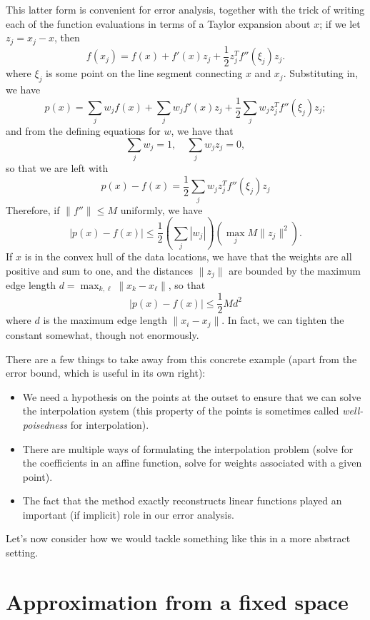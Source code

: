 \documentclass[12pt, leqno]{article} %
\begin{document}
This latter form is convenient for error analysis, together with the
trick of writing each of the function evaluations in terms of a Taylor
expansion about $x$; if we let $z_j = x_j-x$, then
\[
  f(x_j) = f(x) + f'(x) z_j + \frac{1}{2} z_j^T f''(\xi_j) z_j.
\]
where $\xi_j$ is some point on the line segment connecting $x$ and
$x_j$.  Substituting in, we have
\[
  p(x) =
  \sum_{j} w_j f(x) + \sum_j w_j f'(x) z_j +
  \frac{1}{2} \sum_j w_j z_j^T f''(\xi_j) z_j;
\]
and from the defining equations for $w$, we have that 
\[
  \sum_j w_j = 1, \quad \sum_j w_j z_j = 0,
\]
so that we are left with
\[
  p(x) - f(x) = \frac{1}{2} \sum_j w_j z_j^T f''(\xi_j) z_j
\]
Therefore, if $\|f''\| \leq M$ uniformly, we have
\[
  |p(x)-f(x)| \leq \frac{1}{2} (\sum_j |w_j|) (\max_j M \|z_j\|^2).
\]
If $x$ is in the convex hull of the data locations, we have that the
weights are all positive and sum to one, and the distances $\|z_j\|$
are bounded by the maximum edge length
$d = \max_{k,\ell} \|x_k-x_\ell\|$, so that
\[
  |p(x) - f(x)| \leq \frac{1}{2} Md^2
\]
where $d$ is the maximum edge length $\|x_i-x_j\|$.  In fact, we can
tighten the constant somewhat, though not enormously.

There are a few things to take away from this concrete example (apart
from the error bound, which is useful in its own right):
\begin{itemize}
\item We need a hypothesis on the points at the outset to ensure that
  we can solve the interpolation system (this property of the points
  is sometimes called {\em well-poisedness} for interpolation).
\item There are multiple ways of formulating the interpolation problem
  (solve for the coefficients in an affine function, solve for weights
  associated with a given point).
\item The fact that the method exactly reconstructs linear functions
  played an important (if implicit) role in our error analysis.
\end{itemize}
Let's now consider how we would tackle something like this in a more
abstract setting.

\section{Approximation from a fixed space}
\end{document}
